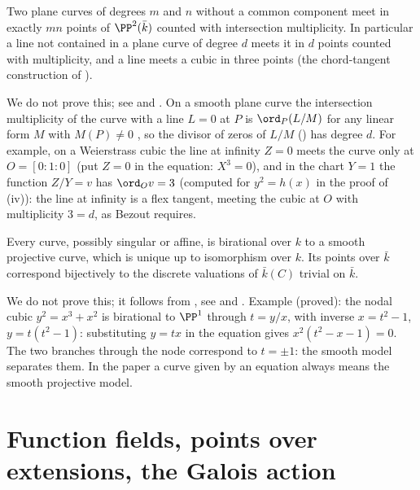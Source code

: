 \begin{theorem}\label{thm:curves:bezout}
Two plane curves of degrees $m$ and $n$ without a common component meet in exactly $mn$ points of $\PP^2(\bar k)$ counted with intersection multiplicity.
In particular a line not contained in a plane curve of degree $d$ meets it in $d$ points counted with multiplicity, and a line meets a cubic in three
points (the chord-tangent construction of ).
\end{theorem}

We do not prove this; see \cite[Chapter 5, Section 3]{Fulton} and \cite[Chapter I, Section 7]{Hartshorne}. On a smooth plane curve the
intersection multiplicity of the curve with a line $L=0$ at $P$ is $\ord_P(L/M)$ for any linear form $M$ with $M(P)\ne0$ \cite[Chapter 3]{Fulton}, so
the divisor of zeros of $L/M$ () has degree $d$. For example, on a Weierstrass cubic the line at infinity $Z=0$ meets the curve
only at $O=[0:1:0]$ (put $Z=0$ in the equation: $X^3=0$), and in the chart $Y=1$ the function $Z/Y=v$ has $\ord_Ov=3$ (computed for $y^2=h(x)$ in the proof of
(iv)): the line at infinity is a flex tangent, meeting the cubic at $O$ with multiplicity $3=d$, as Bezout requires.

\begin{theorem}\label{thm:curves:smooth-model}
Every curve, possibly singular or affine, is birational over $k$ to a smooth projective curve, which is unique up to isomorphism over $k$. Its
points over $\bar k$ correspond bijectively to the discrete valuations of $\bar k(C)$ trivial on $\bar k$.
\end{theorem}

We do not prove this; it follows from , see \cite[Chapter I, Section 6]{Hartshorne} and \cite[Chapter 7]{Fulton}.
Example (proved): the nodal cubic $y^2=x^3+x^2$ is birational to $\PP^1$ through $t=y/x$, with inverse $x=t^2-1$, $y=t(t^2-1)$: substituting $y=tx$
in the equation gives $x^2(t^2-x-1)=0$. The two branches through the node correspond to $t=\pm1$: the smooth model separates them. In the paper
a curve given by an equation always means the smooth projective model.

\section{Function fields, points over extensions, the Galois action}\label{sec:curves:function-fields}

